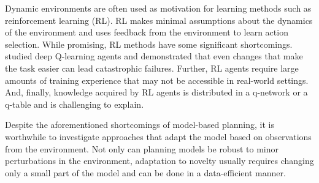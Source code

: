 \documentclass[letterpaper]{article} %
\begin{document}
Dynamic environments are often used as motivation for learning methods such as reinforcement learning (RL). RL makes minimal assumptions about the dynamics of the environment and uses feedback from the environment to learn action selection. While promising, RL methods have some significant shortcomings. \citet{witty2018measuring} studied deep Q-learning agents and demonstrated that even changes that make the task easier can lead catastrophic failures. Further, RL agents require large amounts of training experience that may not be accessible in real-world settings. And, finally, knowledge acquired by RL agents is distributed in a q-network or a q-table and is challenging to explain.  



Despite the aforementioned shortcomings of model-based planning, it is worthwhile to investigate approaches that adapt the model based on observations from the environment. Not only can planning models be robust to minor perturbations in the environment, adaptation to novelty usually requires changing only a small part of the model and can be done in a data-efficient manner. 
\end{document}
